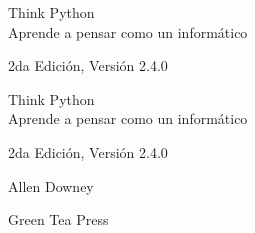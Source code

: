 \documentclass[10pt]{book}
\newcommand{\theversion}{2da Edición, Versión 2.4.0}
\newcommand{\thedate}{}
\begin{document}
\begin{latexonly}

\renewcommand{\blankpage}{\thispagestyle{empty} \quad \newpage}



\thispagestyle{empty}

\begin{flushright}
\vspace*{2.0in}

\begin{spacing}{3}
{\huge Think Python}\\
{\Large Aprende a pensar como un informático}
\end{spacing}

\vspace{0.25in}

\theversion

\thedate

\vfill

\end{flushright}


\blankpage
\blankpage

\pagebreak
\thispagestyle{empty}

\begin{flushright}
\vspace*{2.0in}

\begin{spacing}{3}
{\huge Think Python}\\
{\Large Aprende a pensar como un informático}
\end{spacing}

\vspace{0.25in}

\theversion

\thedate

\vspace{1in}


{\Large
Allen Downey\\
}


\vspace{0.5in}

{\Large Green Tea Press}


\end{flushright}
\end{latexonly}
\end{document}
